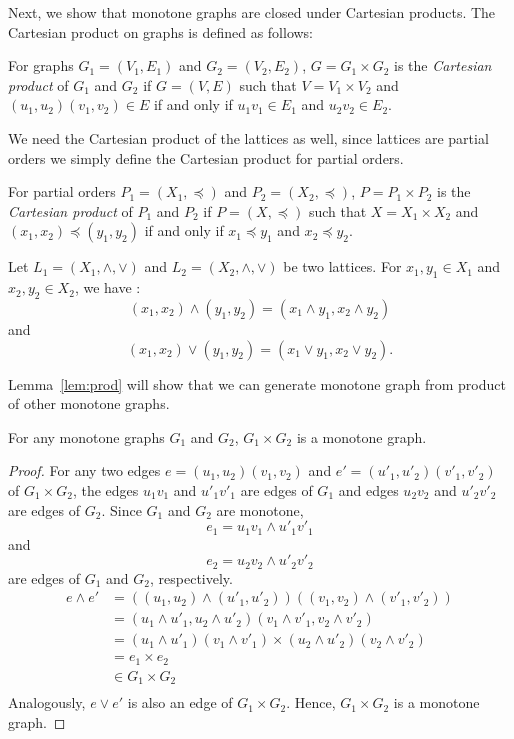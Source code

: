 Next, we show that monotone graphs are closed under Cartesian products.
The Cartesian product on graphs is defined as follows:
\begin{defi} 
For graphs \(G_1=(V_1,E_1)\) and \(G_2=(V_2,E_2)\), \(G = G_1 \times G_2\)
is the \emph{Cartesian product} of \(G_1\) and \(G_2\) if \(G=(V,E)\)
such that \(V=V_1 \times V_2\) and \((u_1,u_2)(v_1,v_2) \in E\)
if and only if \(u_1v_1 \in E_1\) and \(u_2v_2 \in E_2\)\@.
\end{defi}

We need the Cartesian product of the lattices as well,
since lattices are partial orders we simply define the Cartesian product
for partial orders.
\begin{defi} 
For partial orders \(P_1= (X_1,\preceq)\) and \(P_2=(X_2,\preceq)\), 
\(P= P_1 \times P_2\) is the \emph{Cartesian product} of \(P_1\) and \(P_2\)
if \(P=(X,\preceq)\) such that \(X=X_1\times X_2\) and \((x_1,x_2) \preceq (y_1,y_2)\)
if and only if \(x_1\preceq y_1\) and \(x_2\preceq y_2\)\@.
\end{defi}

\begin{rem}
Let \(L_1=(X_1,\wedge,\vee)\) and \(L_2=(X_2,\wedge,\vee)\) be two lattices.
For \(x_1,y_1 \in X_1\) and \(x_2,y_2\in X_2\), we have :
\[(x_1,x_2)\wedge (y_1,y_2) = (x_1\wedge y_1, x_2 \wedge y_2) \]
and \[(x_1,x_2)\vee (y_1,y_2) = (x_1\vee y_1, x_2 \vee y_2).\]
\end{rem}

Lemma~\ref{lem:prod} will show that we can generate monotone graph from product of other
monotone graphs.

\begin{lemma}\label{lem:prod}
For any monotone graphs \(G_1\) and \(G_2\), \(G_1 \times G_2\) is a monotone graph.
\end{lemma}

\begin{proof}
For any two edges \(e = (u_1,u_2)(v_1,v_2)\) and \(e' =(u'_1,u'_2)(v'_1,v'_2)\) of \(G_1\times G_2\),
the edges \(u_1v_1\) and \(u'_1v'_1\) are edges of \(G_1\) and
edges \(u_2v_2\) and \(u'_2v'_2\) are edges of \(G_2\)\@.
Since \(G_1\) and \(G_2\) are monotone,
\[e_1 = u_1v_1 \wedge u'_1v'_1\]
and
\[e_2 = u_2v_2 \wedge u'_2v'_2\]
are edges of \(G_1\) and \(G_2\), respectively.
\begin{align*}
e \wedge e' &= ((u_1,u_2)\wedge(u'_1,u'_2))((v_1,v_2)\wedge(v'_1,v'_2)) \\
&= (u_1\wedge u'_1,u_2 \wedge u'_2)(v_1\wedge v'_1,v_2 \wedge v'_2) \\
&= (u_1\wedge u'_1)(v_1\wedge v'_1) \times (u_2\wedge u'_2)(v_2\wedge v'_2) \\
&= e_1 \times e_2 \\
&\in G_1 \times G_2 \\
\end{align*}
Analogously, \(e \vee e'\) is also an edge of \(G_1\times G_2\)\@. Hence, \(G_1\times G_2\)
is a monotone graph.
\end{proof}

